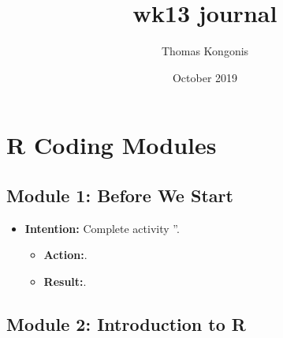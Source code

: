 \documentclass{article}
\title{wk13 journal}
\author{Thomas Kongonis}
\date{October 2019}
\begin{document}
\maketitle

\tableofcontents

\section{R Coding Modules}

\subsection{Module 1: Before We Start}
\begin{itemize}
\item{\textbf{Intention:} Complete activity ''.}

\begin{itemize}
\item{\textbf{Action:}.}
\item{\textbf{Result:}.}
\end{itemize}
\end{itemize}


\subsection{Module 2: Introduction to R}
\end{document}
